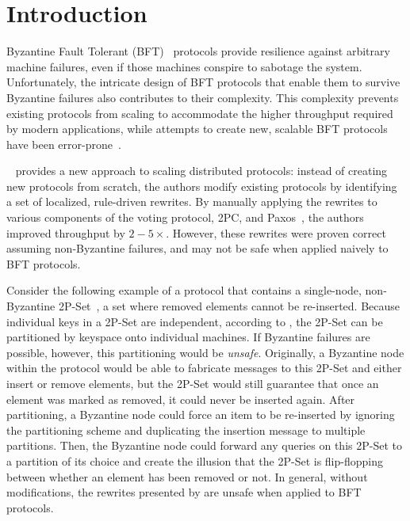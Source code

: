 \section{Introduction}
\label{sec:intro}

Byzantine Fault Tolerant (BFT)~\cite{byzantineGenerals} protocols provide resilience against arbitrary machine failures, even if those machines conspire to sabotage the system.
Unfortunately, the intricate design of BFT protocols that enable them to survive Byzantine failures also contributes to their complexity.
This complexity prevents existing protocols from scaling to accommodate the higher throughput required by modern applications, while attempts to create new, scalable BFT protocols have been error-prone~\cite{zyzzyvaBug, protocolBugsList}.

\sigmodpaper{}~\cite{autocomp} provides a new approach to scaling distributed protocols: instead of creating new protocols from scratch, the authors modify existing protocols by identifying a set of localized, rule-driven rewrites.
By manually applying the rewrites to various components of the voting protocol, 2PC, and Paxos~\cite{paxosComplex}, the authors improved throughput by $2-5\times$.
However, these rewrites were proven correct assuming non-Byzantine failures, and may not be safe when applied naively to BFT protocols.

Consider the following example of a protocol that contains a single-node, non-Byzantine 2P-Set~\cite{crdt}, a set where removed elements cannot be re-inserted.
Because individual keys in a 2P-Set are independent, according to \sigmodpaper{}, the 2P-Set can be partitioned by keyspace onto individual machines.
If Byzantine failures are possible, however, this partitioning would be \emph{unsafe}.
Originally, a Byzantine node within the protocol would be able to fabricate messages to this 2P-Set and either insert or remove elements, but the 2P-Set would still guarantee that once an element was marked as removed, it could never be inserted again.
After partitioning, a Byzantine node could force an item to be re-inserted by ignoring the partitioning scheme and duplicating the insertion message to multiple partitions.
Then, the Byzantine node could forward any queries on this 2P-Set to a partition of its choice and create the illusion that the 2P-Set is flip-flopping between whether an element has been removed or not.
In general, without modifications, the rewrites presented by \sigmodpaper{} are unsafe when applied to BFT protocols.

